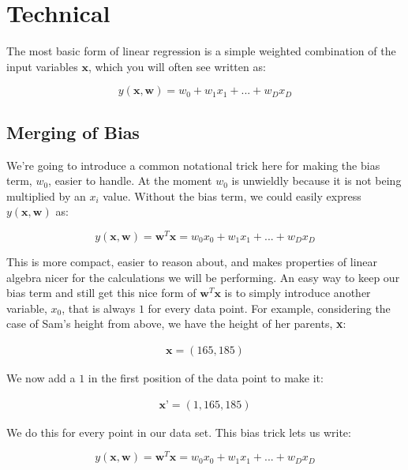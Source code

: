 \section{Technical}
The most basic form of linear regression is a simple weighted combination of the input variables $\textbf{x}$, which you will often see written as:

\begin{equation}
    y(\textbf{x}, \textbf{w}) = w_{0} + w_{1}x_{1} + ... + w_{D}x_{D}
\end{equation}

\subsection{Merging of Bias}
We're going to introduce a common notational trick here for making the bias term, $w_{0}$, easier to handle. At the moment $w_{0}$ is unwieldly because it is not being multiplied by an $x_{i}$ value. Without the bias term, we could easily express $y(\textbf{x}, \textbf{w})$ as:

\begin{equation}
    y(\textbf{x}, \textbf{w}) = \textbf{w}^{T}\textbf{x} = w_{0}x_{0} + w_{1}x_{1} + ... + w_{D}x_{D}
\end{equation}

 This is more compact, easier to reason about, and makes properties of linear algebra nicer for the calculations we will be performing. An easy way to keep our bias term and still get this nice form of $\textbf{w}^{T}\textbf{x}$ is to simply introduce another variable, $x_{0}$, that is always $1$ for every data point. For example, considering the case of Sam's height from above, we have the height of her parents, \textbf{x}:

\begin{align*}
    \textbf{x} = (165, 185)
\end{align*}

We now add a $1$ in the first position of the data point to make it:

\begin{align*}
    \textbf{x'} = (1, 165, 185)
\end{align*}

We do this for every point in our data set. This bias trick lets us write:

\begin{equation}
    y(\textbf{x}, \textbf{w}) = \textbf{w}^{T}\textbf{x} = w_{0}x_{0} + w_{1}x_{1} + ... + w_{D}x_{D}
\end{equation}

